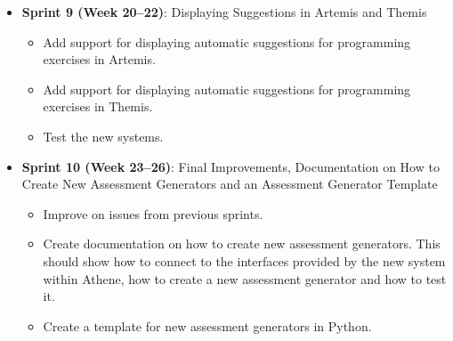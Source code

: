 \begin{itemize}
\begin{itemize}
    \end{itemize}
    \item \textbf{Sprint 9 (Week 20--22)}: Displaying Suggestions in Artemis and Themis
    \begin{itemize}
        \item Add support for displaying automatic suggestions for programming exercises in Artemis.
        \item Add support for displaying automatic suggestions for programming exercises in Themis.
        \item Test the new systems.
    \end{itemize}
    \item \textbf{Sprint 10 (Week 23--26)}: Final Improvements, Documentation on How to Create New Assessment Generators and an Assessment Generator Template
    \begin{itemize}
        \item Improve on issues from previous sprints.
        \item Create documentation on how to create new assessment generators. This should show how to connect to the interfaces provided by the new system within Athene, how to create a new assessment generator and how to test it.
        \item Create a template for new assessment generators in Python.
    \end{itemize}

\end{itemize}


\clearpage

\clearpage




